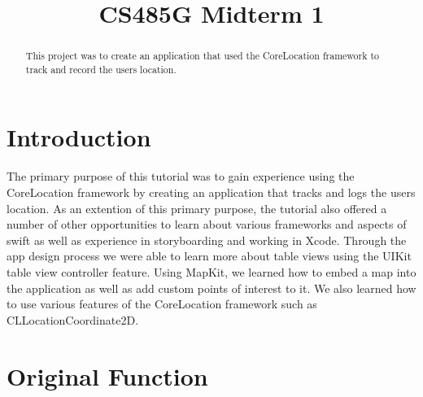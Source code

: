\documentclass[conference]{IEEEtran}
\begin{document}
\title{CS485G Midterm 1}

\author{
\and
{}
\and
{}
}

\maketitle

\begin{abstract}
This project was to create an application that used the CoreLocation framework to track
and record the users location.
\end{abstract}

\section{Introduction}
The primary purpose of this tutorial was to gain experience using the CoreLocation
framework by creating an application that tracks and logs the users location. As an
extention of this primary purpose, the tutorial also offered a number of other opportunities
to learn about various frameworks and aspects of swift as well as experience in storyboarding
and working in Xcode. Through the app design process we were able to learn more about
table views using the UIKit table view controller feature. Using MapKit, we 
learned how to embed a map into the application as well as add custom points of 
interest to it. We also learned how to use various features of the CoreLocation 
framework such as CLLocationCoordinate2D.
\section{Original Function}
\end{document}
